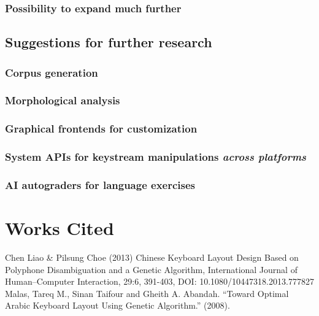 \documentclass[11pt]{article}
\begin{document}
\subsubsection{Possibility to expand much further}
\label{sec:org2537612}

\subsection{Suggestions for further research}
\label{sec:orgbb30185}

\subsubsection{Corpus generation}
\label{sec:org7542443}

\subsubsection{Morphological analysis}
\label{sec:org5913fef}

\subsubsection{Graphical frontends for customization}
\label{sec:org47272d9}

\subsubsection{System APIs for keystream manipulations \emph{across platforms}}
\label{sec:org69d3617}

\subsubsection{AI autograders for language exercises}
\label{sec:orgd7c37a0}



\section{Works Cited}
\label{sec:org6ab9119}

Chen Liao \& Pilsung Choe (2013) Chinese Keyboard Layout Design Based on Polyphone Disambiguation and a Genetic Algorithm, International Journal of Human–Computer Interaction, 29:6, 391-403, DOI: 10.1080/10447318.2013.777827 \\

Malas, Tareq M., Sinan Taifour and Gheith A. Abandah. “Toward Optimal Arabic Keyboard Layout Using Genetic Algorithm.” (2008). \\
\end{document}
